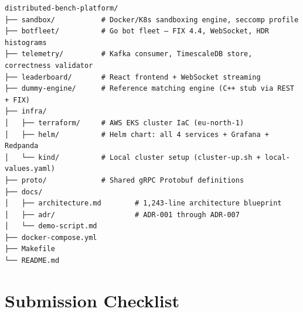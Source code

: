 \documentclass[12pt,a4paper]{article}
\begin{document}
\begin{lstlisting}
distributed-bench-platform/
├── sandbox/           # Docker/K8s sandboxing engine, seccomp profile
├── botfleet/          # Go bot fleet — FIX 4.4, WebSocket, HDR histograms
├── telemetry/         # Kafka consumer, TimescaleDB store, correctness validator
├── leaderboard/       # React frontend + WebSocket streaming
├── dummy-engine/      # Reference matching engine (C++ stub via REST + FIX)
├── infra/
│   ├── terraform/     # AWS EKS cluster IaC (eu-north-1)
│   ├── helm/          # Helm chart: all 4 services + Grafana + Redpanda
│   └── kind/          # Local cluster setup (cluster-up.sh + local-values.yaml)
├── proto/             # Shared gRPC Protobuf definitions
├── docs/
│   ├── architecture.md        # 1,243-line architecture blueprint
│   ├── adr/                   # ADR-001 through ADR-007
│   └── demo-script.md
├── docker-compose.yml
├── Makefile
└── README.md
\end{lstlisting}

\section{Submission Checklist}
\end{document}
